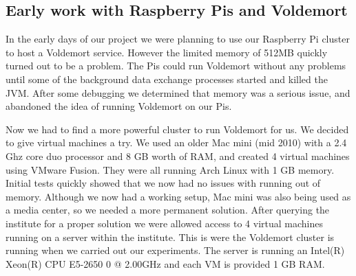 \subsection{Early work with Raspberry Pis and Voldemort}
In the early days of our project we were planning to use our Raspberry Pi cluster to host a Voldemort service. However the limited memory of 512MB quickly turned out to be a problem. The Pis could run Voldemort without any problems until some of the background data exchange processes started and killed the JVM. After some debugging we determined that memory was a serious issue, and abandoned the idea of running Voldemort on our Pis. 

Now we had to find a more powerful cluster to run Voldemort for us. We decided to give virtual machines a try. We used an older Mac mini (mid 2010) with a 2.4 Ghz core duo processor and 8 GB worth of RAM, and created 4 virtual machines using VMware Fusion. They were all running Arch Linux with 1 GB memory. Initial tests quickly showed that we now had no issues with running out of memory. Although we now had a working setup, Mac mini was also being used as a media center, so we needed a more permanent solution. After querying the institute for a proper solution we were allowed access to 4 virtual machines running on a server within the institute. This is were the Voldemort cluster is running when we carried out our experiments. The server is running an Intel(R) Xeon(R) CPU E5-2650 0 @ 2.00GHz and each VM is provided 1 GB RAM.